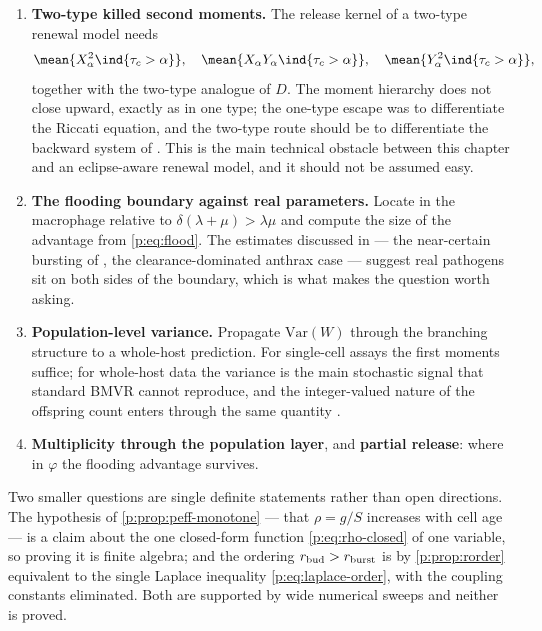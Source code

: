 \begin{enumerate}[leftmargin=1.9em]
\item \textbf{Two-type killed second moments.} The release kernel of a
two-type renewal model needs
\begin{equation*}
\mean{X_\alpha^2\ind\{\tau_c>\alpha\}},\quad
\mean{X_\alpha Y_\alpha\ind\{\tau_c>\alpha\}},\quad
\mean{Y_\alpha^2\ind\{\tau_c>\alpha\}},
\end{equation*}
together with the two-type analogue of $D$. The moment hierarchy does not close upward, exactly as in
one type; the one-type escape was to differentiate the Riccati equation, and
the two-type route should be to differentiate the backward system of
\ChTwoType{}. This is the main technical obstacle between this chapter and
an eclipse-aware renewal model, and it should not be assumed easy.
\item \textbf{The flooding boundary against real parameters.} Locate \yp{}
in the macrophage relative to $\delta(\lambda+\mu)>\lambda\mu$ and compute
the size of the advantage from \cref{p:eq:flood}. The estimates discussed in
\ChDist{} --- the near-certain bursting of \ft{}
\cite{carruthers2020stochastic}, the clearance-dominated anthrax case ---
suggest real pathogens sit on both sides of the boundary, which is what
makes the question worth asking.
\item \textbf{Population-level variance.} Propagate $\mathrm{Var}(W)$
through the branching structure to a whole-host prediction. For single-cell
assays the first moments suffice; for whole-host data the variance is the
main stochastic signal that standard BMVR cannot reproduce, and the
integer-valued nature of the offspring count enters through the same
quantity \cite{williams2024reproduction}.
\item \textbf{Multiplicity through the population layer}, and
\textbf{partial release}: where in $\varphi$ the flooding advantage
survives.
\end{enumerate}

Two smaller questions are single definite statements rather than open
directions. The hypothesis of \cref{p:prop:peff-monotone} --- that
$\rho=g/S$ increases with cell age --- is a claim about the one closed-form
function \cref{p:eq:rho-closed} of one variable, so proving it is finite
algebra; and the ordering $r_{\rm bud}>r_{\rm burst}$ is by
\cref{p:prop:rorder} equivalent to the single Laplace inequality
\cref{p:eq:laplace-order}, with the coupling constants eliminated. Both are
supported by wide numerical sweeps and neither is proved.

